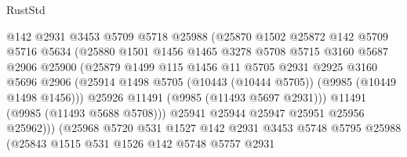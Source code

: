 \begin{lexlean}{RustStd}
\begin{coremodule}
                            @142
                            @2931
                            @3453
                            @5709
                            @5718
                            @25988
                            (@25870
                              @1502
                              @25872
                              @142
                              @5709
                              @5716
                              @5634
                              (@25880
                                @1501
                                @1456
                                @1465
                                @3278
                                @5708
                                @5715
                                @3160
                                @5687
                                @2906
                                @25900
                                (@25879
                                  @1499
                                  @115
                                  @1456
                                  @11
                                  @5705
                                  @2931
                                  @2925
                                  @3160
                                  @5696
                                  @2906
                                  (@25914
                                    @1498
                                    @5705
                                    (@10443 (@10444 @5705))
                                    (@9985 (@10449 @1498 @1456)))
                                  @25926
                                  @11491
                                  (@9985 (@11493 @5697 @2931)))
                                @11491
                                (@9985 (@11493 @5688 @5708)))
                              @25941
                              @25944
                              @25947
                              @25951
                              @25956
                              @25962)))
                        (@25968
                          @5720
                          @531
                          @1527
                          @142
                          @2931
                          @3453
                          @5748
                          @5795
                          @25988
                          (@25843
                            @1515
                            @531
                            @1526
                            @142
                            @5748
                            @5757
                            @2931

\end{coremodule}
\end{lexlean}
